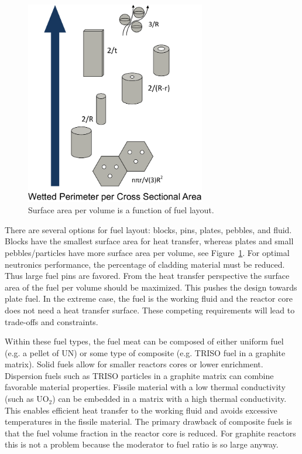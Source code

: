 \begin{figure}[!hbt]
  \label{fig:fuel_geom}
  \centering
  \includegraphics[width=0.70\textwidth]{graphics/SAperVOL.pdf}
  \caption{Surface area per volume is a function of fuel layout.}
\end{figure}

There are several options for fuel layout: blocks, pins, plates, pebbles, and fluid.
Blocks have the smallest surface area for heat transfer, whereas plates and small pebbles/particles have more surface area per volume, see Figure~\ref{fig:fuel_geom}. 
%
%
For optimal neutronics performance, the percentage of cladding material must be reduced. Thus large fuel pins are favored.
From the heat transfer perspective the surface area of the fuel per volume should be maximized. This pushes the design towards plate fuel.
In the extreme case, the fuel is the working fluid and the reactor core does not need a heat transfer surface.
These competing requirements will lead to trade-offs and constraints.

Within these fuel types, the fuel meat can be composed of either uniform fuel (e.g. a pellet of UN) or some type of composite (e.g. TRISO fuel in a graphite matrix).
Solid fuels allow for smaller reactors cores or lower enrichment.
Dispersion fuels such as TRISO particles in a graphite matrix can combine favorable material properties. Fissile material with a low thermal conductivity (such as UO$_2$) can be embedded in a matrix with a high thermal conductivity. 
This enables efficient heat transfer to the working fluid and avoids excessive temperatures in the fissile material.
The primary drawback of composite fuels is that the fuel volume fraction in the reactor core is reduced. For graphite reactors this is not a problem because the moderator to fuel ratio is so large anyway.

